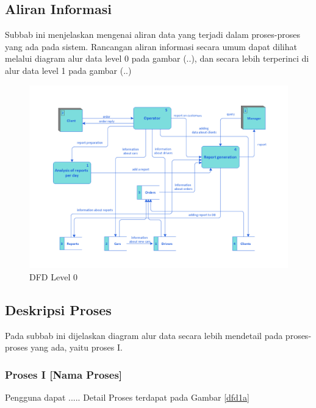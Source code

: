 

  \subsection{Aliran Informasi}
  Subbab ini menjelaskan mengenai aliran data yang terjadi dalam proses-proses yang ada pada sistem. Rancangan aliran informasi secara umum dapat dilihat melalui diagram alur data level 0 pada gambar (..), dan secara lebih terperinci di alur data level 1 pada gambar (..)
      \begin{figure}[htp]
        \centering
        \includegraphics[width=1.0\columnwidth]{images/bab3/Taxi-service-dfd.png}
        \caption{DFD Level 0}
        \label{DFD0}
      \end{figure}
      
  \subsection{Deskripsi Proses}
  
  Pada subbab ini dijelaskan diagram alur data secara lebih mendetail pada proses-proses yang ada, yaitu proses I.
  
  \subsubsection{Proses I [Nama Proses]}
  Pengguna dapat ..... Detail Proses terdapat pada Gambar \ref{dfd1a} 
  
